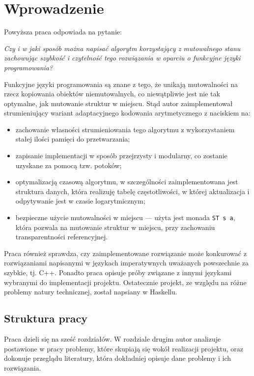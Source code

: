 \documentclass[../../praca.tex]{subfiles}
\begin{document}
\chapter{Wprowadzenie}

Powyższa praca odpowiada na pytanie:
\begin{center}
  \textit{Czy i w jaki sposób można napisać algorytm korzystający z mutowalnego stanu
  zachowując szybkość i czytelność tego rozwiązania w oparciu o funkcyjne
  języki programowania?}
\end{center}

Funkcyjne języki programowania są znane z tego, że unikają mutowalności 
na rzecz kopiowania obiektów niemutowalnych, co niewątpliwie jest nie tak optymalne,
jak mutowanie struktur w miejscu. Stąd autor zaimplementował strumieniujący
wariant adaptacyjnego kodowania arytmetycznego z naciskiem na:
\begin{itemize}
  \item zachowanie własności strumieniowania tego algorytmu z wykorzystaniem stałej
    ilości pamięci do przetwarzania;
  \item zapisanie implementacji w sposób przejrzysty i modularny, co zostanie uzyskane
    za pomocą tzw. potoków;
  \item optymalizacją czasową algorytmu, w szczególności zaimplementowana jest
    struktura danych, która realizuję tabelę częstotliwości, w której aktualizacja
    i odpytywanie jest w czasie logarytmicznym;
  \item bezpieczne użycie mutowalności w miejscu --- użyta jest monada \texttt{ST s a},
    która pozwala na mutowanie struktur w miejscu, przy zachowaniu transparentności
    referencyjnej.
\end{itemize}

Praca również sprawdza, czy zaimplementowane rozwiązanie może konkurować z rozwiązaniami
napisanymi w językach imperatywnych uważanych powszechnie za szybkie, tj. C++. 
Ponadto praca opisuje próby związane z innymi językami wybranymi do implementacji projektu.
Ostatecznie projekt, ze względu na różne problemy natury technicznej, został napsiany
w Haskellu.

\section{Struktura pracy}

Praca dzieli się na sześć rozdziałów. W rozdziale drugim autor analizuje postawione
w pracy problemy, które skupiają się wokół realizacji projektu, oraz dokonuje przeglądu
literatury, która dokładniej opisuje dane problemy i ich rozwiązania.
\end{document}
